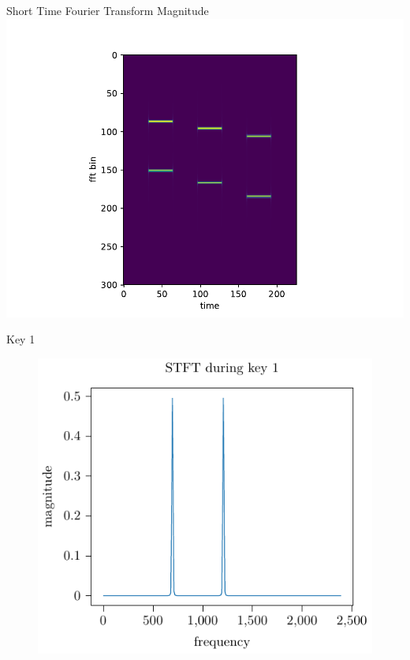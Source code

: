 \documentclass[xcolor=dvipsnames]{beamer}
\begin{document}
\begin{frame}{Short Time Fourier Transform Magnitude}
\centering
\includegraphics[width=0.8\linewidth]{./plots/stft_full.pdf}
\end{frame}

\begin{frame}{Key 1}
\centering
\begin{figure}
\end{figure}
\begin{figure}
\includegraphics[width=0.45\linewidth]{./plots/stft_key_1.pdf}
\end{figure}
\end{frame}
\end{document}
